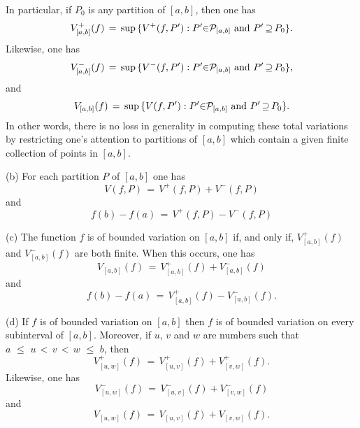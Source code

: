         In particular, if $P_{0}$ is any partition of $[a,b]$, then one has
        \begin{displaymath}
        V^{+}_{[a,b]}(f) \,=\, {\sup}\,\{V^{+}(f,P'): P'{\in}{\cal P}_{[a,b]} \mbox{ and } P' \,{\supseteq}\, P_{0}\}.
        \end{displaymath}
    Likewise, one has
        \begin{displaymath}
        V^{-}_{[a,b]}(f) \,=\, {\sup}\,\{V^{-}(f,P'): P'{\in}{\cal P}_{[a,b]} \mbox{ and } P' \,{\supseteq}\, P_{0}\},
        \end{displaymath}
    and
        \begin{displaymath}
        V_{[a,b]}(f) \,=\, {\sup}\,\{V(f,P'): P'{\in}{\cal P}_{[a,b]} \mbox{ and } P' \,{\supseteq}\, P_{0}\}.
        \end{displaymath}
    In other words, there is no loss in generality in computing these total variations by restricting one's attention to partitions of $[a,b]$ which contain a given finite collection of points in $[a,b]$.

\V

        (b) For each partition $P$ of $[a,b]$ one has
        \begin{equation}
        \label{EqnF.100A}
        V(f,P) \,=\, V^{+}(f,P) + V^{-}(f,P)
        \end{equation}
    and
        \begin{equation}
        \label{EqnF.100AA}
        f(b) - f(a) \,=\, V^{+}(f,P) - V^{-}(f,P)
        \end{equation}

\V

        (c) The function $f$ is of bounded variation on $[a,b]$ if, and only if, $V^{+}_{[a,b]}(f)$ and $V^{-}_{[a,b]}(f)$ are both finite.
    When this occurs, one has
        \begin{equation}
        \label{EqnF.100B}
        V_{[a,b]} (f) \,=\, V^{+}_{[a,b]}(f) + V^{-}_{[a,b]}(f)
        \end{equation}
    and
        \begin{equation}
        \label{EqnF.100BB}
        f(b) - f(a) \,=\, V^{+}_{[a,b]}(f) - V^{-}_{[a,b]}(f).
        \end{equation}

\V

        (d) If $f$ is of bounded variation on $[a,b]$ then $f$ is of bounded variation on every subinterval of $[a,b]$.
    Moreover, if $u$, $v$ and $w$ are numbers such that $a\,\,{\leq}\,\,u\,<\,v\,<\,w\,\,{\leq}\,\,b$, then
        \begin{equation}
        \label{EqnF.100C}
        V^{+}_{[u,w]}(f) \,=\, V^{+}_{[u,v]}(f) + V^{+}_{[v,w]}(f).
        \end{equation}
    Likewise, one has
        \begin{equation}
        \label{EqnF.100CC}
        V^{-}_{[u,w]}(f) \,=\, V^{-}_{[u,v]}(f) + V^{-}_{[v,w]}(f)
        \end{equation}
    and
        \begin{equation}
        \label{EqnF.100CCC}
        V_{[u,w]}(f) \,=\, V_{[u,v]}(f) + V_{[v,w]}(f).
        \end{equation}

